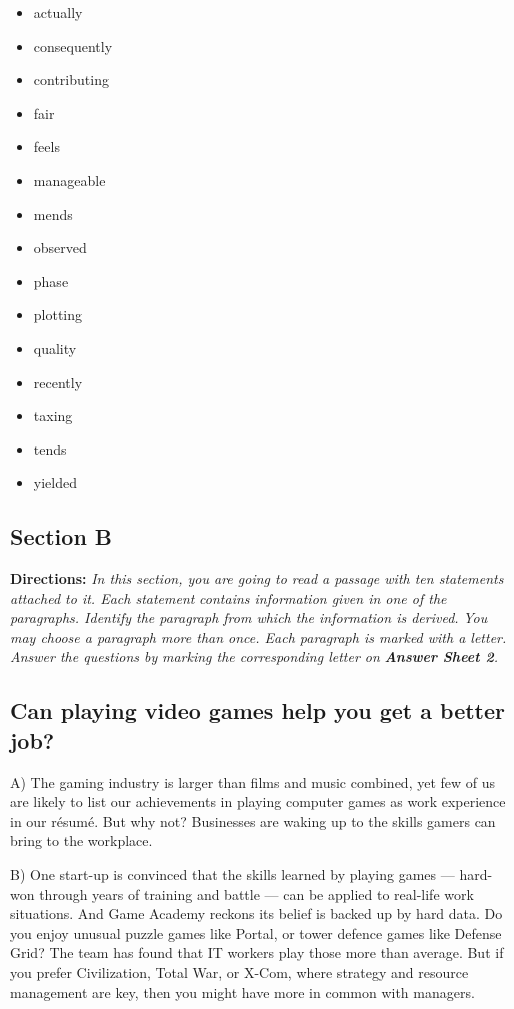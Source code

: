 \documentclass[UTF8,11pt]{ctexart}
\begin{document}
\begin{itemize}[leftmargin=2em,itemsep=.2em,topsep=.4em]\item[A.] actually
\item[B.] consequently
\item[C.] contributing
\item[D.] fair
\item[E.] feels
\item[F.] manageable
\item[G.] mends
\item[H.] observed
\item[I.] phase
\item[J.] plotting
\item[K.] quality
\item[L.] recently
\item[M.] taxing
\item[N.] tends
\item[O.] yielded
\end{itemize}

\subsection*{\textbf{Section B}}


\textbf{Directions:} \textit{In this section, you are going to read a passage with ten statements attached to it. Each statement} \textit{contains information given in one of the paragraphs. Identify the paragraph from which the information is derived.} \textit{You may choose a paragraph more than once. Each paragraph is marked with a letter. Answer the questions by} \textit{marking the corresponding letter on }\textbf{\textit{Answer Sheet 2}}\textit{.}


\subsection*{\textbf{Can playing video games help you get a better job?}}


A) The gaming industry is larger than films and music combined, yet few of us are likely to list our achievements in playing computer games as work experience in our résumé. But why not? Businesses are waking up to the skills gamers can bring to the workplace.


B) One start-up is convinced that the skills learned by playing games — hard-won through years of training and battle — can be applied to real-life work situations. And Game Academy reckons its belief is backed up by hard data. Do you enjoy unusual puzzle games like Portal, or tower defence games like Defense Grid? The team has found that IT workers play those more than average. But if you prefer Civilization, Total War, or X-Com, where strategy and resource management are key, then you might have more in common with managers.
\end{document}
